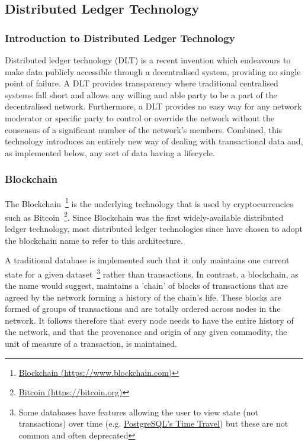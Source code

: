 \subsection{Distributed Ledger Technology}

\subsubsection{Introduction to Distributed Ledger Technology}

Distributed ledger technology (DLT) is a recent invention which endeavours to make data publicly accessible through a decentralised system, providing no single point of failure. A DLT provides transparency where traditional centralised systems fall short and allows any willing and able party to be a part of the decentralised network. Furthermore, a DLT provides no easy way for any network moderator or specific party to control or override the network without the consensus of a significant number of the network's members. Combined, this technology introduces an entirely new way of dealing with transactional data and, as implemented below, any sort of data having a lifecycle.

\subsubsection{Blockchain}

The Blockchain~\footnote{\href{https://www.blockchain.com/}{Blockchain (https://www.blockchain.com)}} is the underlying technology that is used by cryptocurrencies such as Bitcoin~\footnote{\href{https://bitcoin.org/en/}{Bitcoin (https://bitcoin.org)}}. Since Blockchain was the first widely-available distributed ledger technology, most distributed ledger technologies since have chosen to adopt the blockchain name to refer to this architecture.

A traditional database is implemented such that it only maintains one current state for a given dataset~\footnote{Some databases have features allowing the user to view state (not transactions) over time (e.g. \href{https://www.postgresql.org/docs/6.3/static/c0503.htm}{PostgreSQL's Time Travel}) but these are not common and often deprecated} rather than transactions. In contrast, a blockchain, as the name would suggest, maintains a 'chain' of blocks of transactions that are agreed by the network forming a history of the chain's life. These blocks are formed of groups of transactions and are totally ordered across nodes in the network. It follows therefore that every node needs to have the entire history of the network, and that the provenance and origin of any given commodity, the unit of measure of a transaction, is maintained.

